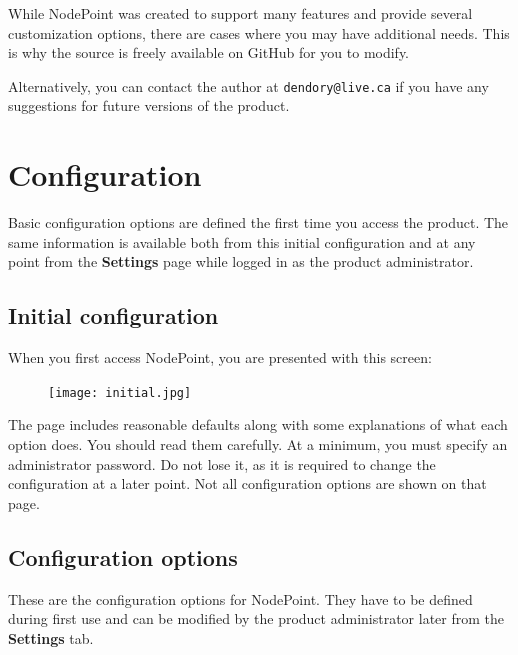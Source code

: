 \documentclass[11pt]{article}
\begin{document}
While NodePoint was created to support many features and provide several customization options, there are cases where you may have additional needs. This is why the source is freely available on GitHub for you to modify.

Alternatively, you can contact the author at \texttt{dendory@live.ca} if you have any suggestions for future versions of the product.

\clearpage
\section{Configuration}
Basic configuration options are defined the first time you access the product. The same information is available both from this initial configuration and at any point from the \textbf{Settings} page while logged in as the product administrator.

\subsection{Initial configuration}
When you first access NodePoint, you are presented with this screen:

\begin{figure}[h]
\texttt{[image: initial.jpg]}
\end{figure}

The page includes reasonable defaults along with some explanations of what each option does. You should read them carefully. At a minimum, you must specify an administrator password. Do not lose it, as it is required to change the configuration at a later point. Not all configuration options are shown on that page.

\subsection{Configuration options}

These are the configuration options for NodePoint. They have to be defined during first use and can be modified by the product administrator later from the \textbf{Settings} tab.
\end{document}
